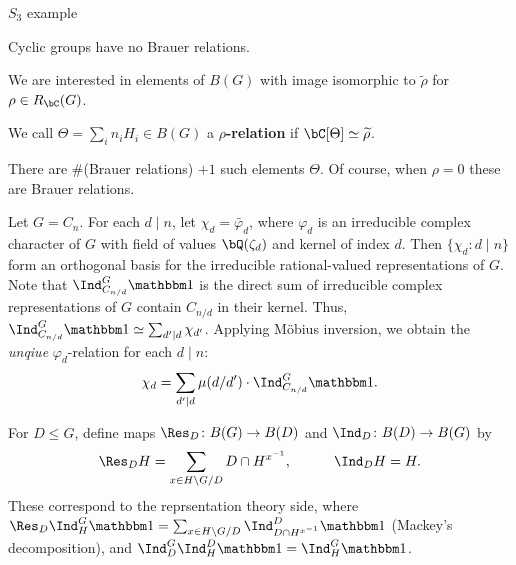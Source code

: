 \begin{example}
    {\color{red} $S_3$ example}
\end{example}

\begin{example}
Cyclic groups have no Brauer relations. 
\end{example}

We are interested in elements of $B(G)$ with image isomorphic to $\widetilde{\rho}$ for $\rho \in R_{\bC}(G)$. 
\begin{defn}
We call $\Theta = \sum_i n_i H_i \in B(G)$ a \textbf{$\rho$-relation} if $\bC[\Theta] \simeq \widetilde{\rho}$. 
\end{defn}
There are $\#$(Brauer relations) $+ 1$ such elements $\Theta$. Of course, when $\rho = 0$ these are Brauer relations. 


\begin{example}\label{cyclic-relns}
    Let $G = C_n$. For each $d \mid n$, let $\chi_d = \widetilde{\varphi_d}$, where $\varphi_d$ is an irreducible complex character of $G$ with field of values $\bQ(\zeta_d)$ and kernel of index $d$.
    Then $\{ \chi_d \colon d\mid n \}$ form an orthogonal basis for the irreducible rational-valued representations of $G$. Note that $\Ind_{C_{n/ d}}^G \trivial$ is the direct sum of irreducible complex representations of $G$ contain $C_{n / d}$ in their kernel. Thus, $\Ind_{C_{n/ d}}^G \trivial \simeq \sum_{d' \mid d} \chi_{d'}$. Applying M\"{o}bius inversion, we obtain the \textit{unqiue} $\varphi_d$-relation for each $d \mid n$:
    \[ \chi_d = \sum_{d' \mid d} \mu(d / d') \cdot \Ind_{C_{n/ d}}^G \trivial. \]
    \end{example}

\begin{notn}
    For $D \leq G$, define maps $\Res_D \colon B(G) \to B(D)$ and $\Ind_D \colon B(D) \to B(G)$ by
    \[  \Res_D H = \sum_{x \in H \backslash G / D} D \cap H^{x^{-1}}, \qquad \quad \Ind_D H = H. \]
    These correspond to the reprsentation theory side, where $\Res_D \Ind_{H}^G \trivial = \sum_{x \in H \backslash G / D} \Ind_{D \cap H^{x^{-1}}}^D \trivial$ (Mackey's decomposition), and $\Ind_{D}^G\Ind_{H}^D \trivial = \Ind_{H}^G \trivial$.
\end{notn}